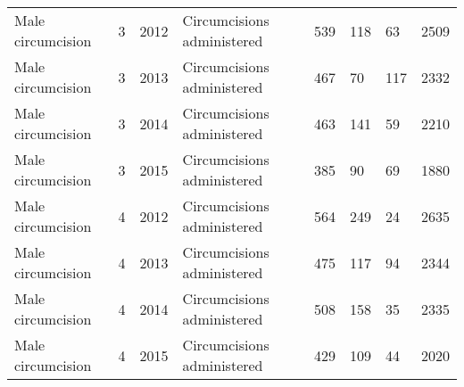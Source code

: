 \documentclass{article}
\begin{document}
\begin{table}[]
\begin{tabular}{llllllll}
Male circumcision                   & 3    & 2012 & Circumcisions administered & 539       & 118                & 63              & 2509   \\
Male circumcision                   & 3    & 2013 & Circumcisions administered & 467       & 70                 & 117             & 2332   \\
Male circumcision                   & 3    & 2014 & Circumcisions administered & 463       & 141                & 59              & 2210   \\
Male circumcision                   & 3    & 2015 & Circumcisions administered & 385       & 90                 & 69              & 1880   \\
Male circumcision                   & 4    & 2012 & Circumcisions administered & 564       & 249                & 24              & 2635   \\
Male circumcision                   & 4    & 2013 & Circumcisions administered & 475       & 117                & 94              & 2344   \\
Male circumcision                   & 4    & 2014 & Circumcisions administered & 508       & 158                & 35              & 2335   \\
Male circumcision                   & 4    & 2015 & Circumcisions administered & 429       & 109                & 44              & 2020
\end{tabular}
\end{table}

\end{document}

